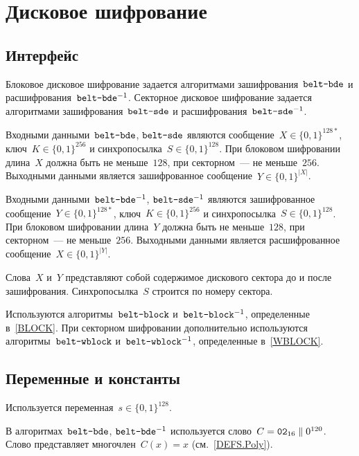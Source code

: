 \section{Дисковое шифрование}\label{DSK}

\subsection{Интерфейс}\label{DSK.IFace}

Блоковое дисковое шифрование задается алгоритмами 
зашифрования~$\texttt{belt-bde}$ и расшифрования~$\texttt{belt-bde}^{-1}$.
%
Секторное дисковое шифрование задается алгоритмами 
зашифрования~$\texttt{belt-sde}$ и расшифрования~$\texttt{belt-sde}^{-1}$.

Входными данными~$\texttt{belt-bde}$, $\texttt{belt-sde}$ являются 
сообщение~$X\in\{0,1\}^{128*}$, ключ~$K\in\{0,1\}^{256}$ и 
синхропосылка~$S\in\{0,1\}^{128}$. 
%
При блоковом шифровании длина~$X$ должна быть не меньше~$128$, при 
секторном~--- не меньше~$256$.
%
Выходными данными является зашифрованное сообщение~$Y\in\{0,1\}^{|X|}$.

Входными данными~$\texttt{belt-bde}^{-1}$, $\texttt{belt-sde}^{-1}$ являются 
зашифрованное сообщение~$Y\in\{0,1\}^{128*}$, ключ~$K\in\{0,1\}^{256}$ и 
синхропосылка~$S\in\{0,1\}^{128}$. 
%
При блоковом шифровании длина~$Y$ должна быть не меньше~$128$, при 
секторном~--- не меньше~$256$.
%
Выходными данными является расшифрованное сообщение~$X\in\{0,1\}^{|Y|}$.

Слова~$X$ и~$Y$ представляют собой содержимое дискового сектора до и после
зашифрования. Синхропосылка~$S$ строится по номеру сектора.

Используются алгоритмы~$\texttt{belt-block}$ и~$\texttt{belt-block}^{-1}$, 
определенные в~\ref{BLOCK}. 
%
При секторном шифровании дополнительно используются 
алгоритмы~$\texttt{belt-wblock}$ и~$\texttt{belt-wblock}^{-1}$, 
определенные в~\ref{WBLOCK}.  

\subsection{Переменные и константы}\label{DSK.Vars}

Используется переменная~$s\in\{0,1\}^{128}$. 

В алгоритмах~$\texttt{belt-bde}$, $\texttt{belt-bde}^{-1}$ 
используется слово~$C=\texttt{02}_{16}\parallel 0^{120}$.
Слово представляет многочлен~$C(x)=x$ (см.~\ref{DEFS.Poly}).

